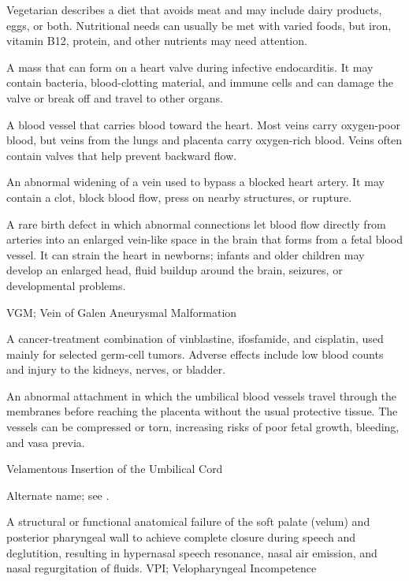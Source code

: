  Vegetarian describes a diet that avoids meat and may include dairy products, eggs, or both. Nutritional needs can usually be met with varied foods, but iron, vitamin B12, protein, and other nutrients may need attention.

 A mass that can form on a heart valve during infective endocarditis. It may contain bacteria, blood-clotting material, and immune cells and can damage the valve or break off and travel to other organs.

 A blood vessel that carries blood toward the heart. Most veins carry oxygen-poor blood, but veins from the lungs and placenta carry oxygen-rich blood. Veins often contain valves that help prevent backward flow.

 An abnormal widening of a vein used to bypass a blocked heart artery. It may contain a clot, block blood flow, press on nearby structures, or rupture.

 A rare birth defect in which abnormal connections let blood flow directly from arteries into an enlarged vein-like space in the brain that forms from a fetal blood vessel. It can strain the heart in newborns; infants and older children may develop an enlarged head, fluid buildup around the brain, seizures, or developmental problems.

\synonyms
VGM; Vein of Galen Aneurysmal Malformation

 A cancer-treatment combination of vinblastine, ifosfamide, and cisplatin, used mainly for selected germ-cell tumors. Adverse effects include low blood counts and injury to the kidneys, nerves, or bladder.

 An abnormal attachment in which the umbilical blood vessels travel through the membranes before reaching the placenta without the usual protective tissue. The vessels can be compressed or torn, increasing risks of poor fetal growth, bleeding, and vasa previa.

\synonyms
Velamentous Insertion of the Umbilical Cord

 Alternate name; see .

 A structural or functional anatomical failure of the soft palate (velum) and posterior pharyngeal wall to achieve complete closure during speech and deglutition, resulting in hypernasal speech resonance, nasal air emission, and nasal regurgitation of fluids.
\synonyms
VPI; Velopharyngeal Incompetence

